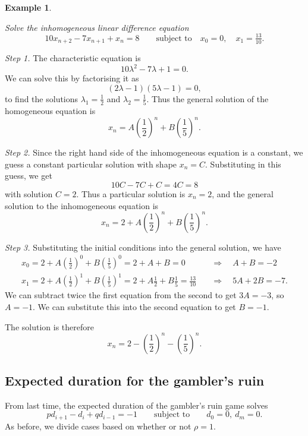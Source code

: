 \documentclass[
  a4paper,
]{article}
\theoremstyle{definition}
\theoremstyle{definition}
\newtheorem{example}{Example}[section]
\theoremstyle{definition}
\theoremstyle{remark}
\begin{document}
\begin{example}
\protect\hypertarget{exm:lde3}{}\label{exm:lde3}

\emph{Solve the inhomogeneous linear difference equation}
\[ 10 x_{n+2} - 7x_{n+1} + x_n = 8 \qquad \text{subject to} \quad x_0 = 0,\quad x_1 = \tfrac{13}{10} . \]

\emph{Step 1.} The characteristic equation is
\[ 10\lambda^2 - 7\lambda + 1 = 0 . \]
We can solve this by factorising it as
\[ (2\lambda - 1) (5\lambda - 1) = 0 , \]
to find the solutions \(\lambda_1 = \frac12\) and \(\lambda_2 = \frac15\). Thus the general solution of the homogeneous equation is
\[ x_n = A\left(\frac12\right)^n + B\left(\frac15\right)^n . \]

\emph{Step 2.} Since the right hand side of the inhomogeneous equation is a constant, we guess a constant particular solution with shape \(x_n = C\). Substituting in this guess, we get
\[ 10C - 7C + C = 4C = 8 \]
with solution \(C=2\). Thus a particular solution is \(x_n = 2\), and the general solution to the inhomogeneous equation is
\[ x_n = 2 + A\left(\frac12\right)^n + B\left(\frac15\right)^n . \]

\emph{Step 3.} Substituting the initial conditions into the general solution, we have
\begin{align*}
x_0 = 2 + A\left(\frac12\right)^0 + B\left(\frac15\right)^0 = 2 + A + B = 0 \quad &\Rightarrow \quad A + B = -2 \\
x_1 = 2 + A\left(\frac12\right)^1 + B\left(\frac15\right)^1 = 2 + A\frac12 + B\frac15 = \frac{13}{10} \quad &\Rightarrow \quad 5A + 2B = -7.
\end{align*}
We can subtract twice the first equation from the second to get \(3A = -3\), so \(A = -1\). We can substitute this into the second equation to get \(B = -1\).

The solution is therefore
\[ x_n = 2 - \left(\frac12\right)^n - \left(\frac15\right)^n . \]

\end{example}

\hypertarget{duration-solve}{%
\subsection{Expected duration for the gambler's ruin}\label{duration-solve}}

From last time, the expected duration of the gambler's ruin game solves
\[ pd_{i+1} - d_i + qd_{i-1} = -1 \qquad \text{subject to} \qquad d_0 = 0,\ d_m = 0. \]
As before, we divide cases based on whether or not \(\rho = 1\).
\end{document}
